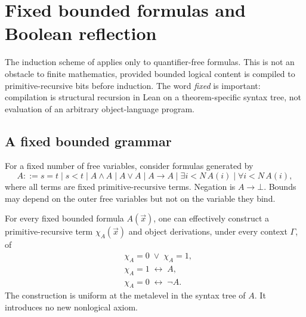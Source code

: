 \section{Fixed bounded formulas and Boolean reflection}
\label{sec:boolean}

The induction scheme of \iPRA{} applies only to quantifier-free formulas.  This is not an obstacle to finite mathematics, provided bounded logical content is compiled to primitive-recursive bits before induction.  The word \emph{fixed} is important: compilation is structural recursion in Lean on a theorem-specific syntax tree, not evaluation of an arbitrary object-language program.

\subsection{A fixed bounded grammar}

For a fixed number of free variables, consider formulas generated by
\[
  A ::= s=t\mid s<t\mid A\wedge A\mid A\vee A\mid A\to A
       \mid \exists i<N\,A(i)\mid \forall i<N\,A(i),
\]
where all terms are fixed primitive-recursive terms.  Negation is \(A\to\bot\).  Bounds may depend on the outer free variables but not on the variable they bind.

\begin{theorem}
\label{thm:boolean-reflection}
For every fixed bounded formula \(A(\vec x)\), one can effectively construct a primitive-recursive term \(\chi_A(\vec x)\) and object derivations, under every context \(\Gamma\), of
\begin{align}
 &\chi_A=0\;\vee\;\chi_A=1, \label{eq:reflect-bit}\\
 &\chi_A=1\;\leftrightarrow\; A, \label{eq:reflect-one}\\
 &\chi_A=0\;\leftrightarrow\; \neg A. \label{eq:reflect-zero}
\end{align}
The construction is uniform at the metalevel in the syntax tree of \(A\).  It introduces no new nonlogical axiom.
\end{theorem}

